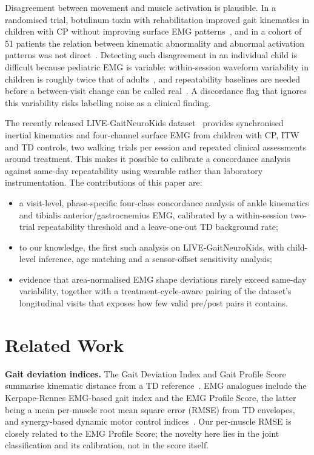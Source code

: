 \documentclass[conference]{IEEEtran}
\begin{document}
Disagreement between movement and muscle activation is plausible. In a randomised trial, botulinum toxin with rehabilitation improved gait kinematics in children with CP without improving surface EMG patterns~\cite{vanderhouwen2011btx}, and in a cohort of 51 patients the relation between kinematic abnormality and abnormal activation patterns was not direct~\cite{syczewska2016emg}. Detecting such disagreement in an individual child is difficult because pediatric EMG is variable: within-session waveform variability in children is roughly twice that of adults~\cite{granata2005repeat}, and repeatability baselines are needed before a between-visit change can be called real~\cite{steele2019repeat}. A discordance flag that ignores this variability risks labelling noise as a clinical finding.

The recently released LIVE-GaitNeuroKids dataset~\cite{fernandez2026live,zenodo2026live} provides synchronised inertial kinematics and four-channel surface EMG from children with CP, ITW and TD controls, two walking trials per session and repeated clinical assessments around treatment. This makes it possible to calibrate a concordance analysis against same-day repeatability using wearable rather than laboratory instrumentation. The contributions of this paper are:
\begin{itemize}
\item a visit-level, phase-specific four-class concordance analysis of ankle kinematics and tibialis anterior/gastrocnemius EMG, calibrated by a within-session two-trial repeatability threshold and a leave-one-out TD background rate;
\item to our knowledge, the first such analysis on LIVE-GaitNeuroKids, with child-level inference, age matching and a sensor-offset sensitivity analysis;
\item evidence that area-normalised EMG shape deviations rarely exceed same-day variability, together with a treatment-cycle-aware pairing of the dataset's longitudinal visits that exposes how few valid pre/post pairs it contains.
\end{itemize}

\section{Related Work}
\textbf{Gait deviation indices.} The Gait Deviation Index and Gait Profile Score summarise kinematic distance from a TD reference~\cite{schwartz2008gdi,baker2009gps}. EMG analogues include the Kerpape-Rennes EMG-based gait index and the EMG Profile Score, the latter being a mean per-muscle root mean square error (RMSE) from TD envelopes, and synergy-based dynamic motor control indices~\cite{davoudi2025fingerprint,schwartz2016dmc}. Our per-muscle RMSE is closely related to the EMG Profile Score; the novelty here lies in the joint classification and its calibration, not in the score itself.
\end{document}
